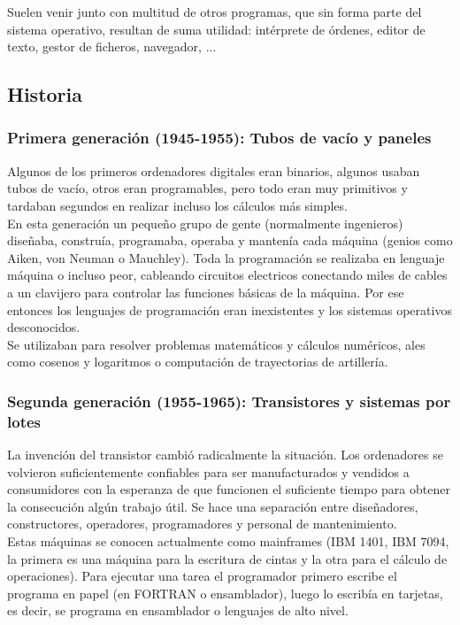 \documentclass{article}
\begin{document}
Suelen venir junto con multitud de otros programas, que sin forma parte del sistema operativo, resultan de suma utilidad: intérprete de órdenes, editor de texto, gestor de ficheros, navegador, ...

\subsection{Historia}
\subsubsection{Primera generación (1945-1955): Tubos de vacío y paneles}
Algunos de los primeros ordenadores digitales eran binarios, algunos usaban tubos de vacío, otros eran programables, pero todo eran muy primitivos y tardaban segundos en realizar incluso los cálculos más simples.\\

En esta generación un pequeño grupo de gente (normalmente ingenieros) diseñaba, construía, programaba, operaba y mantenía cada máquina (genios como Aiken, von Neuman o Mauchley). Toda la programación se realizaba en lenguaje máquina o incluso peor, cableando circuitos electricos conectando miles de cables a un clavijero para controlar las funciones básicas de la máquina. Por ese entonces los lenguajes de programación eran inexistentes y los sistemas operativos desconocidos.\\

Se utilizaban para resolver problemas matemáticos y cálculos numéricos, ales como cosenos y logaritmos o computación de trayectorias de artillería.

\subsubsection{Segunda generación (1955-1965): Transistores y sistemas por lotes}
La invención del transistor cambió radicalmente la situación. Los ordenadores se volvieron suficientemente confiables para ser manufacturados y vendidos a consumidores con la esperanza de que funcionen el suficiente tiempo para obtener la consecución algún trabajo útil. Se hace una separación entre diseñadores, constructores, operadores, programadores y personal de mantenimiento.\\

Estas máquinas se conocen actualmente como mainframes (IBM 1401, IBM 7094, la primera es una máquina para la escritura de cintas y la otra para el cálculo de operaciones). Para ejecutar una tarea el programador primero escribe el programa en papel (en FORTRAN o ensamblador), luego lo escribía en tarjetas, es decir, se programa en ensamblador o lenguajes de alto nivel.\\
\end{document}
